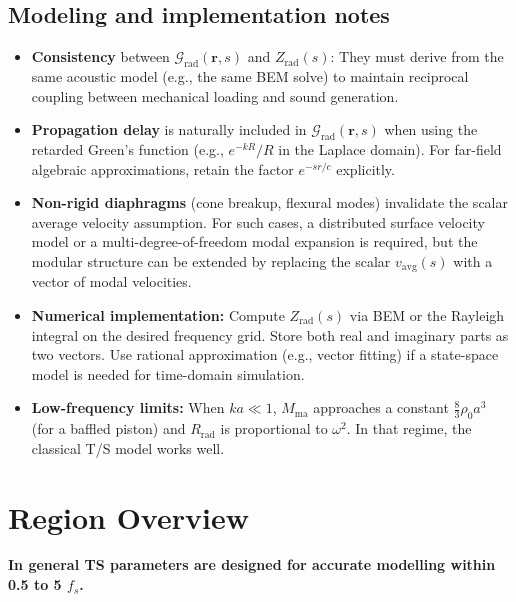 \subsection{Modeling and implementation notes}

\begin{itemize}
  \item \textbf{Consistency} between \(\mathcal{G}_{\mathrm{rad}}(\mathbf{r},s)\) and \(Z_{\mathrm{rad}}(s)\): They must derive from the same acoustic model (e.g., the same BEM solve) to maintain reciprocal coupling between mechanical loading and sound generation.
  \item \textbf{Propagation delay} is naturally included in \(\mathcal{G}_{\mathrm{rad}}(\mathbf{r},s)\) when using the retarded Green's function (e.g., \(e^{-kR}/R\) in the Laplace domain). For far-field algebraic approximations, retain the factor \(e^{-sr/c}\) explicitly.
  \item \textbf{Non-rigid diaphragms} (cone breakup, flexural modes) invalidate the scalar average velocity assumption. For such cases, a distributed surface velocity model or a multi-degree-of-freedom modal expansion is required, but the modular structure can be extended by replacing the scalar \(v_{\mathrm{avg}}(s)\) with a vector of modal velocities.
  \item \textbf{Numerical implementation:} Compute \(Z_{\mathrm{rad}}(s)\) via BEM or the Rayleigh integral on the desired frequency grid. Store both real and imaginary parts as two vectors. Use rational approximation (e.g., vector fitting) if a state-space model is needed for time-domain simulation.
  \item \textbf{Low-frequency limits:} When \(ka\ll1\), \(M_{\mathrm{ma}}\) approaches a constant \(\frac{8}{3}\rho_0 a^3\) (for a baffled piston) and \(R_{\mathrm{rad}}\) is proportional to \(\omega^2\). In that regime, the classical T/S model works well.
\end{itemize}

\section{Region Overview}
\textbf{In general TS parameters are designed for accurate modelling within 0.5 to 5 $f_s$.}

